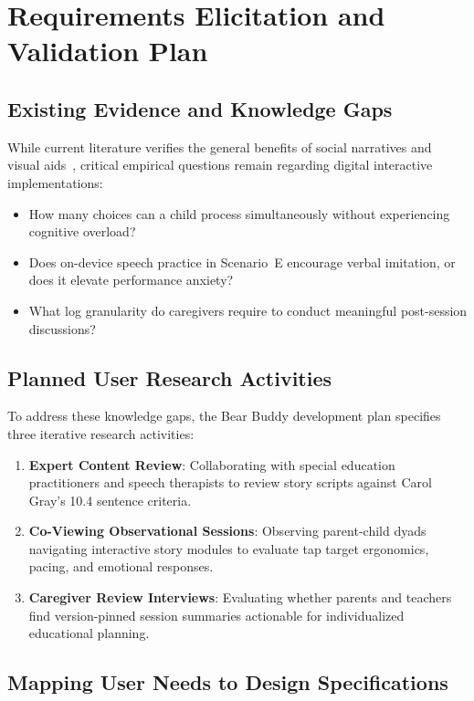 \section{Requirements Elicitation and Validation Plan}

\subsection{Existing Evidence and Knowledge Gaps}

While current literature verifies the general benefits of social narratives and visual aids~\cite{gray_criteria_2023, wcag22}, critical empirical questions remain regarding digital interactive implementations:
\begin{itemize}
    \item How many choices can a child process simultaneously without experiencing cognitive overload?
    \item Does on-device speech practice in Scenario~E encourage verbal imitation, or does it elevate performance anxiety?
    \item What log granularity do caregivers require to conduct meaningful post-session discussions?
\end{itemize}

\subsection{Planned User Research Activities}

To address these knowledge gaps, the Bear Buddy development plan specifies three iterative research activities:
\begin{enumerate}
    \item \textbf{Expert Content Review}: Collaborating with special education practitioners and speech therapists to review story scripts against Carol Gray's 10.4 sentence criteria.
    \item \textbf{Co-Viewing Observational Sessions}: Observing parent-child dyads navigating interactive story modules to evaluate tap target ergonomics, pacing, and emotional responses.
    \item \textbf{Caregiver Review Interviews}: Evaluating whether parents and teachers find version-pinned session summaries actionable for individualized educational planning.
\end{enumerate}

\subsection{Mapping User Needs to Design Specifications}

